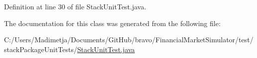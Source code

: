 Definition at line 30 of file Stack\+Unit\+Test.\+java.



The documentation for this class was generated from the following file\+:\begin{DoxyCompactItemize}
\item 
C\+:/\+Users/\+Madimetja/\+Documents/\+Git\+Hub/bravo/\+Financial\+Market\+Simulator/test/stack\+Package\+Unit\+Tests/\hyperlink{_stack_unit_test_8java}{Stack\+Unit\+Test.\+java}\end{DoxyCompactItemize}
